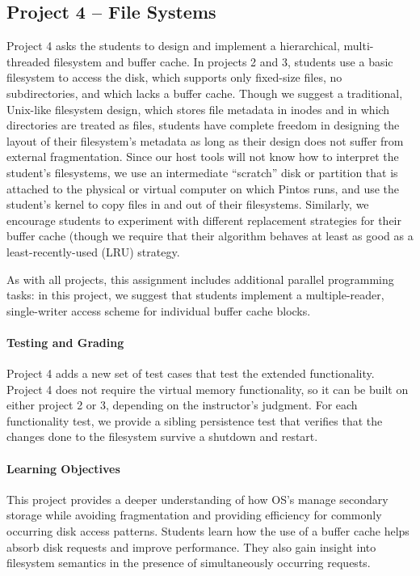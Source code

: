 \subsection{Project 4 -- File Systems}
Project 4 asks the students to design and implement a hierarchical, multi-threaded
filesystem and buffer cache.  In projects 2 and 3, students use a basic filesystem
to access the disk, which supports only fixed-size files, no subdirectories,
and which lacks a buffer cache.  
Though we suggest a traditional, Unix-like filesystem design, which stores file
metadata in inodes and in which directories are treated as files, students have
complete freedom in designing the layout of their filesystem's metadata as long
as their design does not suffer from external fragmentation.
Since our host tools will not know how to interpret the student's filesystems,
we use an intermediate ``scratch'' disk or partition that is attached to the 
physical or virtual computer on which Pintos runs, and use the student's kernel
to copy files in and out of their filesystems.
Similarly, we encourage students to experiment with different replacement
strategies for their buffer cache (though we require that their algorithm
behaves at least as good as a least-recently-used (LRU) strategy.

As with all projects, this assignment includes additional parallel programming 
tasks: in this project, we suggest that students implement 
a multiple-reader, single-writer access scheme for individual buffer cache blocks.

\paragraph{Testing and Grading}
Project 4 adds a new set of test cases that test the extended functionality.
Project 4 does not require the virtual memory functionality, so it can be built
on either project 2 or 3, depending on the instructor's judgment.
For each functionality test, we provide a sibling persistence test that verifies 
that the changes done to the filesystem survive a shutdown and restart.

\paragraph{Learning Objectives}
This project provides a deeper understanding of how OS's manage secondary storage
while avoiding fragmentation and providing efficiency for commonly occurring 
disk access patterns.  
Students learn how the use of a buffer cache helps absorb disk requests and
improve performance.
They also gain insight into filesystem semantics in the presence of simultaneously
occurring requests.


